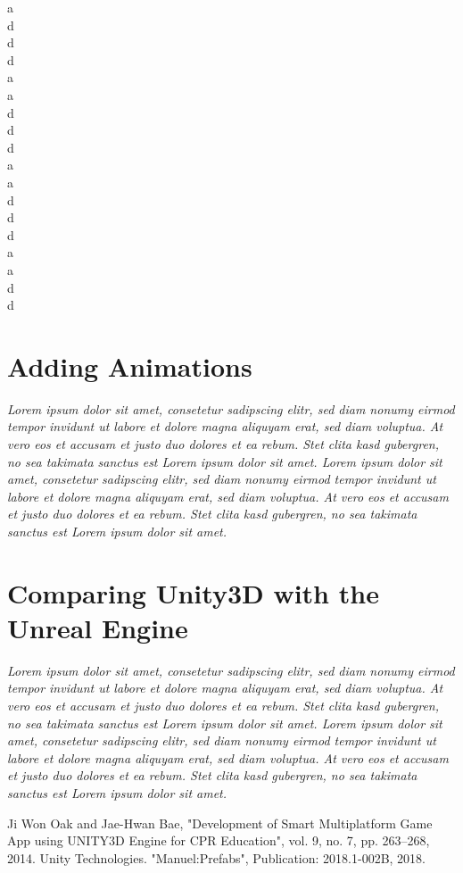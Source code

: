 \documentclass[conference]{IEEEtran}
\begin{document}
a\\
d\\
d\\
d\\
a\\
a\\
d\\
d\\
d\\
a\\
a\\
d\\
d\\
d\\
a\\
a\\
d\\
d\\

\section{Adding Animations}

\emph{Lorem ipsum dolor sit amet, consetetur sadipscing elitr, sed diam nonumy eirmod tempor invidunt ut labore et dolore magna aliquyam erat, sed diam voluptua. At vero eos et accusam et justo duo dolores et ea rebum. Stet clita kasd gubergren, no sea takimata sanctus est Lorem ipsum dolor sit amet. Lorem ipsum dolor sit amet, consetetur sadipscing elitr, sed diam nonumy eirmod tempor invidunt ut labore et dolore magna aliquyam erat, sed diam voluptua. At vero eos et accusam et justo duo dolores et ea rebum. Stet clita kasd gubergren, no sea takimata sanctus est Lorem ipsum dolor sit amet.}

\section{Comparing Unity3D with the Unreal Engine}

\emph{Lorem ipsum dolor sit amet, consetetur sadipscing elitr, sed diam nonumy eirmod tempor invidunt ut labore et dolore magna aliquyam erat, sed diam voluptua. At vero eos et accusam et justo duo dolores et ea rebum. Stet clita kasd gubergren, no sea takimata sanctus est Lorem ipsum dolor sit amet. Lorem ipsum dolor sit amet, consetetur sadipscing elitr, sed diam nonumy eirmod tempor invidunt ut labore et dolore magna aliquyam erat, sed diam voluptua. At vero eos et accusam et justo duo dolores et ea rebum. Stet clita kasd gubergren, no sea takimata sanctus est Lorem ipsum dolor sit amet.}


\begin{thebibliography}{00}
 Ji Won Oak and Jae-Hwan Bae, "Development of Smart Multiplatform Game App using UNITY3D Engine for CPR Education", vol. 9, no. 7, pp. 263--268, 2014.
 Unity Technologies. "Manuel:Prefabs", Publication: 2018.1-002B, 2018.
\end{thebibliography}
\end{document}
